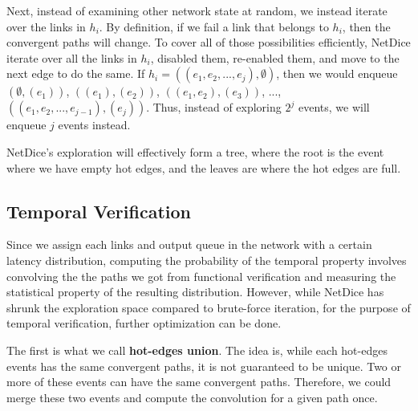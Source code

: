 \documentclass[10pt,sigconf,letterpaper,anonymous,nonacm]{acmart}
\begin{document}
Next, instead of examining other network state at random, we instead iterate over the links in 
$h_i$.
By definition, if we fail a link that belongs to $h_i$, then the convergent paths will change.
To cover all of those possibilities efficiently, NetDice iterate over all the links in $h_i$, 
disabled them, re-enabled them, and move to the next edge to do the same.
If $h_i = ((e_1, e_2, ..., e_j), \emptyset)$, then we would enqueue $(\emptyset, (e_1))$, 
$((e_1), (e_2))$, $((e_1, e_2), (e_3))$, ..., $((e_1, e_2, ..., e_{j-1}), (e_j))$.
Thus, instead of exploring $2^j$ events, we will enqueue $j$ events instead. 

NetDice's exploration will effectively form a tree, where the root is the event where we have 
empty hot edges, and the leaves are where the hot edges are full.

\subsection{Temporal Verification}
Since we assign each links and output queue in the network with a certain latency distribution, 
computing the probability of the temporal property involves convolving the the paths we got from 
functional verification and measuring the statistical property of the resulting distribution.
However, while NetDice has shrunk the exploration space compared to brute-force iteration, for
the purpose of temporal verification, further optimization can be done.

The first is what we call \textbf{hot-edges union}. 
The idea is, while each hot-edges events has the same convergent paths, it is not guaranteed to be 
unique. 
Two or more of these events can have the same convergent paths.
Therefore, we could merge these two events and compute the convolution for a given path once.


\end{document}
